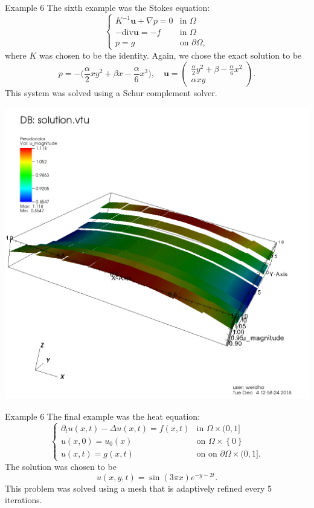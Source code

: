 \documentclass[9pt]{beamer}
\newcommand{\set}[1]{\left\{#1\right\}}
\newcommand{\grad}{\nabla}
\begin{document}
\begin{frame}{Example 6}
	The sixth example was the Stokes equation:
	$$
	\begin{cases}
	K^{-1}\mathbf{u} + \grad p = 0 &\text{in }\Omega\\
	-\text{div}\mathbf{u} = -f & \text{in }\Omega\\
	p = g & \text{on }\partial \Omega,
	\end{cases}
	$$
	where $K$ was chosen to be the identity. Again, we chose the exact solution to be
	$$
		p = -\bigg(\frac{\alpha}{2}xy^2 + \beta x - \frac{\alpha}{6}x^3\bigg), \quad \mathbf{u} = \begin{pmatrix}
		\frac{\alpha}{2}y^2 + \beta - \frac{\alpha}{6}x^2\\
		\alpha xy
		\end{pmatrix}.
	$$
	This system was solved using a Schur complement solver.
\end{frame}
\begin{frame}
	\centering
	\includegraphics[scale=.25]{visit0000.png}
\end{frame}

\begin{frame}{Example 6}
	The final example was the heat equation:
	$$
	\begin{cases}
	\partial_t u(x,t) -\Delta u(x,t) = f(x,t) &\text{in }\Omega\times (0,1]\\
	u(x,0) = u_0(x) & \text{on } \Omega \times \set{0}\\
	u(x,t) = g(x,t) & \text{on }\text{on }\partial\Omega\times (0,1].
	\end{cases}
	$$
	The solution was chosen to be
	$$
		u(x,y,t) = \sin(3\pi x)e^{-y-2t}.
	$$
	This problem was solved using a mesh that is adaptively refined every 5 iterations.
\end{frame}
\end{document}
